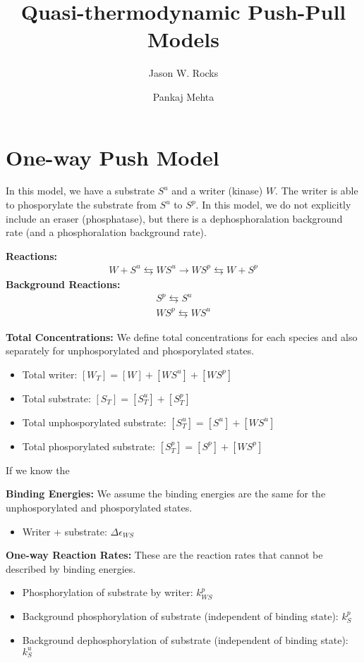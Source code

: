 \documentclass[aps,onecolumn,superscriptaddress,notitlepage]{revtex4-1}
\begin{document}
\title{Quasi-thermodynamic Push-Pull Models}
\author{Jason W. Rocks}
\author{Pankaj Mehta}
\maketitle


\section{One-way Push Model}


In this model, we have a substrate $S^u$ and a writer (kinase) $W$. 
The writer is able to phosporylate the substrate from $S^u$ to $S^p$.
In this model, we do not explicitly include an eraser (phosphatase), 
but there is a dephosphoralation background rate (and a phosphoralation background rate).

\textbf{Reactions:}
\begin{gather}
W + S^u \leftrightarrows WS^u \rightarrow WS^p \leftrightarrows W + S^p
\end{gather}
\textbf{Background Reactions:}
\begin{gather}
S^p \leftrightarrows S^u\\
WS^p \leftrightarrows WS^u
\end{gather}


\textbf{Total Concentrations:}
We define total concentrations for each species and also separately for unphosporylated and phosporylated states.
\begin{itemize}
\item Total writer: $[W_T] = [W] + [WS^u] + [WS^p]$
\item Total substrate: $[S_T] = [S^u_T] + [S^p_T]$
\item Total unphosporylated substrate: $[S^u_T] = [S^u] + [WS^u]$
\item Total phosporylated substrate: $[S^p_T] = [S^p] + [WS^p]$
\end{itemize}
If we know the 

\textbf{Binding Energies:}
We assume the binding energies are the same for the unphosporylated and phosporylated states.
\begin{itemize}
\item Writer + substrate: $\Delta\epsilon_{WS}$
\end{itemize}

\textbf{One-way Reaction Rates:}
These are the reaction rates that cannot be described by binding energies.
\begin{itemize}
\item Phosphorylation of substrate by writer: $k_{WS}^p$
\item Background phosphorylation of substrate (independent of binding state): $k_S^p$
\item Background dephosphorylation of substrate (independent of binding state): $k_S^u$
\end{itemize}
\end{document}
